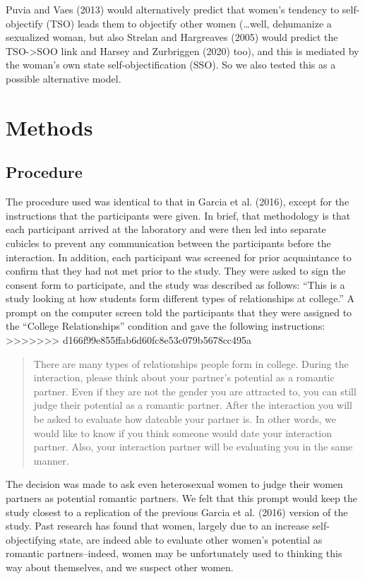 \documentclass[
  man]{apa6}
\begin{document}
Puvia and Vaes (2013) would alternatively predict that women's tendency
to self-objectify (TSO) leads them to objectify other women
(\ldots{}well, dehumanize a sexualized woman, but also Strelan and
Hargreaves (2005) would predict the TSO-\textgreater{}SOO link and
Harsey and Zurbriggen (2020) too), and this is mediated by the woman's
own state self-objectification (SSO). So we also tested this as a
possible alternative model.

\section{Methods}\label{methods}

\subsection{Procedure}\label{procedure}

The procedure used was identical to that in Garcia et al. (2016), except
for the instructions that the participants were given. In brief, that
methodology is that each participant arrived at the laboratory and were
then led into separate cubicles to prevent any communication between the
participants before the interaction. In addition, each participant was
screened for prior acquaintance to confirm that they had not met prior
to the study. They were asked to sign the consent form to participate,
and the study was described as follows: \enquote{This is a study looking
at how students form different types of relationships at college.} A
prompt on the computer screen told the participants that they were
assigned to the \enquote{College Relationships} condition and gave the
following instructions:
>>>>>>> d166f99e855ffab6d60fc8e53c079b5678cc495a

\begin{quote}
There are many types of relationships people form in college. During the interaction, please think about your partner's potential as a romantic partner. Even if they are not the gender you are attracted to, you can still judge their potential as a romantic partner. After the interaction you will be asked to evaluate how dateable your partner is. In other words, we would like to know if you think someone would date your interaction partner. Also, your interaction partner will be evaluating you in the same manner.
\end{quote}

The decision was made to ask even heterosexual women to judge their women partners as potential romantic partners. We felt that this prompt would keep the study closest to a replication of the previous Garcia et al. (2016) version of the study. Past research has found that women, largely due to an increase self-objectifying state, are indeed able to evaluate other women's potential as romantic partners--indeed, women may be unfortunately used to thinking this way about themselves, and we suspect other women.
\end{document}
